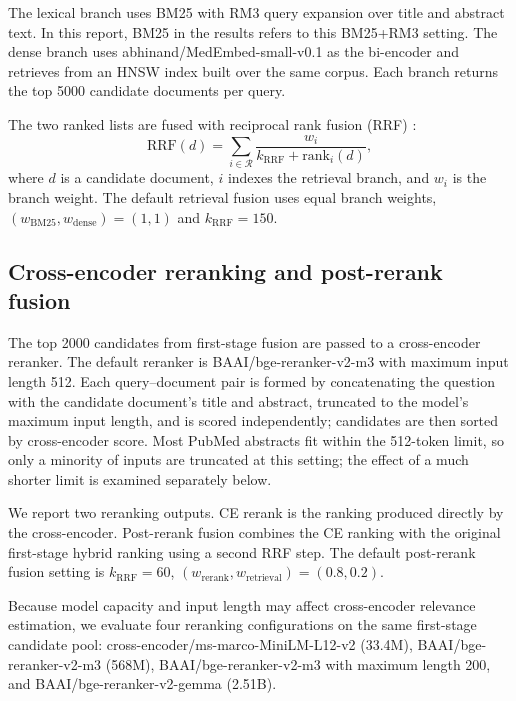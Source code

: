 \documentclass[
]{ceurart}
\begin{document}
The lexical branch uses BM25 \cite{robertson2009bm25} with RM3 \cite{abduljaleel2004rm3} query expansion over title and abstract text. In this report, BM25 in the results refers to this BM25+RM3 setting. The dense branch uses abhinand/MedEmbed-small-v0.1 \cite{medembedSmall2024} as the bi-encoder and retrieves from an HNSW \cite{malkov2020hnsw} index built over the same corpus. Each branch returns the top 5000 candidate documents per query.

The two ranked lists are fused with reciprocal rank fusion (RRF) \cite{cormack2009rrf}:
\[
\mathrm{RRF}(d) = \sum_{i \in \mathcal{R}}
\frac{w_i}{k_{\mathrm{RRF}} + \mathrm{rank}_i(d)},
\]
where $d$ is a candidate document, $i$ indexes the retrieval branch, and $w_i$ is the branch weight. The default retrieval fusion uses equal branch weights, $(w_{\mathrm{BM25}}, w_{\mathrm{dense}})=(1,1)$ and $k_{\mathrm{RRF}}=150$.

\subsection{Cross-encoder reranking and post-rerank fusion}

The top 2000 candidates from first-stage fusion are passed to a cross-encoder reranker. The default reranker is BAAI/bge-reranker-v2-m3 with maximum input length 512. Each query--document pair is formed by concatenating the question with the candidate document's title and abstract, truncated to the model's maximum input length, and is scored independently; candidates are then sorted by cross-encoder score. Most PubMed abstracts fit within the 512-token limit, so only a minority of inputs are truncated at this setting; the effect of a much shorter limit is examined separately below.

We report two reranking outputs. CE rerank is the ranking produced directly by the cross-encoder. Post-rerank fusion combines the CE ranking with the original first-stage hybrid ranking using a second RRF step. The default post-rerank fusion setting is $k_{\mathrm{RRF}}=60$, $(w_{\mathrm{rerank}}, w_{\mathrm{retrieval}})=(0.8,0.2)$.

Because model capacity and input length may affect cross-encoder relevance estimation, we evaluate four reranking configurations on the same first-stage candidate pool: cross-encoder/ms-marco-MiniLM-L12-v2 \cite{msMarcoMiniLML12,wang2020minilm} (33.4M), BAAI/bge-reranker-v2-m3 \cite{bgeRerankerM3,chen2024m3embedding} (568M), BAAI/bge-reranker-v2-m3 \cite{bgeRerankerM3,chen2024m3embedding} with maximum length 200, and BAAI/bge-reranker-v2-gemma \cite{bgeRerankerGemma,li2023llara} (2.51B).
\end{document}
